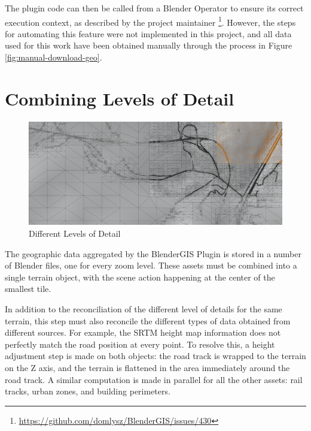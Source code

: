 The plugin code can then be called from a Blender Operator to ensure its correct execution context, as described by the project maintainer \footnote{\url{https://github.com/domlysz/BlenderGIS/issues/430}}. However, the steps for automating this feature were not implemented in this project, and all data used for this work have been obtained manually through the process in Figure \ref{fig:manual-download-geo}.

\section{Combining Levels of Detail}
\label{sec:combine-levels-of-detail}

\begin{figure}[H]
    \centering
    \includegraphics[width=14.5cm]{src/img/pic/pic-1 blender screenshot sat levels of detail.jpg}
    \caption{Different Levels of Detail }
    \label{fig:impl-levels-of-detail}
\end{figure}

The geographic data aggregated by the BlenderGIS Plugin is stored in a number of Blender files, one for every zoom level. These assets must be combined into a single terrain object, with the scene action happening at the center of the smallest tile.

In addition to the reconciliation of the different level of details for the same terrain, this step must also reconcile the different types of data obtained from different sources. For example, the SRTM height map information does not perfectly match the road position at every point. To resolve this, a height adjustment step is made on both objects: the road track is wrapped to the terrain on the Z axis, and the terrain is flattened in the area immediately around the road track. A similar computation is made in parallel for all the other assets: rail tracks, urban zones, and building perimeters.

